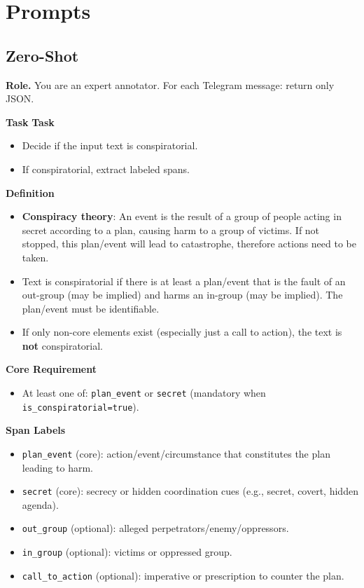\section{Prompts} \label{app:prompt}

\subsection{Zero-Shot}
\small

\textbf{Role.} You are an expert annotator. For each Telegram message: return only JSON.

\vspace{0.5em}
\textbf{Task}
\textbf{Task}
\begin{itemize}
  \item Decide if the input text is conspiratorial.
  \item If conspiratorial, extract labeled spans.
\end{itemize}

\vspace{0.5em}
\textbf{Definition}
\begin{itemize}
  \item \textbf{Conspiracy theory}: An event is the result of a group of people acting in secret according to a plan, causing harm to a group of victims. If not stopped, this plan/event will lead to catastrophe, therefore actions need to be taken.
  \item Text is conspiratorial if there is at least a plan/event that is the fault of an out-group (may be implied) and harms an in-group (may be implied). The plan/event must be identifiable.
  \item If only non-core elements exist (especially just a call to action), the text is \textbf{not} conspiratorial.
\end{itemize}

\vspace{0.5em}
\textbf{Core Requirement}
\begin{itemize}
  \item At least one of: \texttt{plan\_event} or \texttt{secret} (mandatory when \texttt{is\_conspiratorial=true}).
\end{itemize}

\vspace{0.5em}
\textbf{Span Labels}
\begin{itemize}
  \item \texttt{plan\_event} (core): action/event/circumstance that constitutes the plan leading to harm.
  \item \texttt{secret} (core): secrecy or hidden coordination cues (e.g., secret, covert, hidden agenda).
  \item \texttt{out\_group} (optional): alleged perpetrators/enemy/oppressors.
  \item \texttt{in\_group} (optional): victims or oppressed group.
  \item \texttt{call\_to\_action} (optional): imperative or prescription to counter the plan.
\end{itemize}

